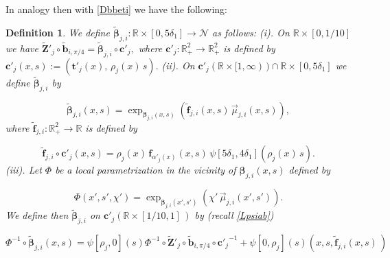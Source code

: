 \documentclass[12pt,namelimits,sumlimits]{amsart}
\newtheorem{definition}[theorem]{Definition}
\theoremstyle{remark}
\numberwithin{equation}{section}
\begin{document}
In analogy then with \ref{Dbbeti} we have the following:

\addtocounter{equation}{1}
\begin{definition}
\label{Dbbetixi}
We define 
${\widetilde{\boldsymbol{\beta}}}_{j,i}:{\mathbb{R}}\times[0,5\delta_1]\to{{\mathcal{N}}}$
as follows:
\newline
(i).
On ${\mathbb{R}}\times[0,1/10]$ we have
$
{\widetilde{\boldsymbol{Z}}}'_j\circ {\widetilde{\boldsymbol{b}}}_{i,\pi/4}={\widetilde{\boldsymbol{\beta}}}_{j,i}\circ{\boldsymbol{c}}'_j,
$
where ${\boldsymbol{c}}'_j:{{{\mathbb{R}}^2_+}}\to{{{\mathbb{R}}^2_+}}$ is defined by
$
{\boldsymbol{c}}'_j(x,s):=({\boldsymbol{t}}'_j(x),\,\rho_j(x)\,s).
$
\newline
(ii).
On ${\boldsymbol{c}}'_j({\mathbb{R}}\times[1,\infty)\,)\cap{\mathbb{R}}\times[0,5\delta_1]$
we define 
${\widetilde{\boldsymbol{\beta}}}_{j,i}$ by
\addtocounter{theorem}{1}
\begin{equation}
\label{Ebbetixi}
{\widetilde{\boldsymbol{\beta}}}_{j,i} (x,s)=\exp_{{\boldsymbol{\beta}}_{j,i}(x,s)}
\left(
{\widetilde{\boldsymbol{f}}}_{j,i}(x,s)\,{\vec{\mu}}_{j,i}(x,s)
\right),
\end{equation}
where ${\widetilde{\boldsymbol{f}}}_{j,i}:{{{\mathbb{R}}^2_+}}\to{\mathbb{R}}$ is defined by
\addtocounter{theorem}{1}
\begin{equation}
\label{Efftippxi}
{\widetilde{\boldsymbol{f}}}_{j,i}\circ{\boldsymbol{c}}'_j(x,s)=
\rho_j(x)\,
\boldsymbol{f}_{\alpha'_j(x)} ( x, s)
\,
\psi[5\delta_1,4\delta_1](\rho_j(x)\, s).
\end{equation}
(iii).
Let $\Phi$ be a local parametrization in the vicinity of 
${\boldsymbol{\beta}}_{j,i}(x,s)$ defined by
\addtocounter{theorem}{1}
\begin{equation}
\label{EPhixi}
\Phi(x',s',\chi')=
\exp_{{\boldsymbol{\beta}}_{j,i}(x',s')}
(
\chi'\,{\vec{\mu}}_{j,i}(x',s')
).
\end{equation}
We define then
${\widetilde{\boldsymbol{\beta}}}_{j,i}$ on
${\boldsymbol{c}}'_j({\mathbb{R}}\times[1/10,1]\,)$ 
by (recall \ref{Lpsiab})
\addtocounter{theorem}{1}
\begin{equation}
\label{Ebbeti3xi}
\Phi^{-1}\circ{\widetilde{\boldsymbol{\beta}}}_{j,i}(x,s)=
\psi[\rho_j,0](s)\Phi^{-1}\circ
{\widetilde{\boldsymbol{Z}}}'_j\circ {\widetilde{\boldsymbol{b}}}_{i,\pi/4}\circ{{\boldsymbol{c}}'_j}^{-1}+
\psi[0,\rho_j](s)(x,s,{\widetilde{\boldsymbol{f}}}_{j,i}(x,s)\,)
\end{equation}
\end{definition}
\end{document}
